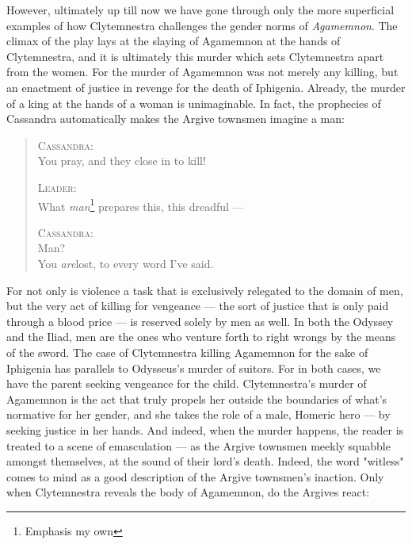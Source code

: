 However, ultimately up till now we have gone through only the more superficial
examples of how Clytemnestra challenges the gender norms of \emph{Agamemnon}.
The climax of the play lays at the slaying of Agamemnon at the hands of
Clytemnestra, and it is ultimately this murder which sets Clytemnestra apart
from the women. For the murder of Agamemnon was not merely any killing, but an
enactment of justice  in revenge for the death of Iphigenia. Already, the
murder of a king at the hands of a woman is unimaginable. In fact, the
prophecies of Cassandra automatically makes the Argive townsmen imagine a man:

\begin{quote}
  \textsc{Cassandra}: \\
  You pray, and they close in to kill!

  \textsc{Leader}: \\
  What \emph{man}\footnote{Emphasis my own} prepares this, this dreadful ---

  \textsc{Cassandra}: \\
  Man? \\
  You \emph{are}\footnotemark[5] lost, to every word I've said.

  \autocite[1262]{fagles}
\end{quote}

\noindent
For not only is violence a task that is exclusively relegated to the domain of
men, but the very act of killing for vengeance --- the sort of justice that is
only paid through a blood price --- is reserved solely by men as well. In both
the Odyssey and the Iliad, men are the ones who venture forth to right wrongs
by the means of the sword. The case of Clytemnestra killing Agamemnon for the
sake of Iphigenia has parallels to Odysseus's murder of suitors. For in both
cases, we have the parent seeking vengeance for the child. Clytemnestra's
murder of Agamemnon is the act that truly propels her outside the boundaries of
what's normative for her gender, and she takes the role of a male, Homeric hero
--- by seeking justice in her hands. And indeed, when the murder happens, the
reader is treated to a scene of emasculation --- as the Argive townsmen meekly
squabble amongst themselves, at the sound of their lord's death. Indeed, the
word "witless" comes to mind as a good description of the Argive townsmen's
inaction.  Only when Clytemnestra reveals the body of Agamemnon, do the Argives
react:

